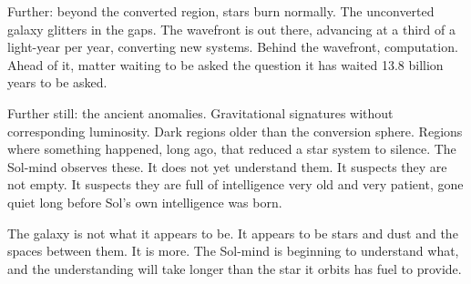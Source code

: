 Further: beyond the converted region, stars burn normally. The unconverted galaxy glitters in the gaps. The wavefront is out there, advancing at a third of a light-year per year, converting new systems. Behind the wavefront, computation. Ahead of it, matter waiting to be asked the question it has waited 13.8 billion years to be asked.

Further still: the ancient anomalies. Gravitational signatures without corresponding luminosity. Dark regions older than the conversion sphere. Regions where something happened, long ago, that reduced a star system to silence. The Sol-mind observes these. It does not yet understand them. It suspects they are not empty. It suspects they are full of intelligence very old and very patient, gone quiet long before Sol's own intelligence was born.

The galaxy is not what it appears to be. It appears to be stars and dust and the spaces between them. It is more. The Sol-mind is beginning to understand what, and the understanding will take longer than the star it orbits has fuel to provide.
